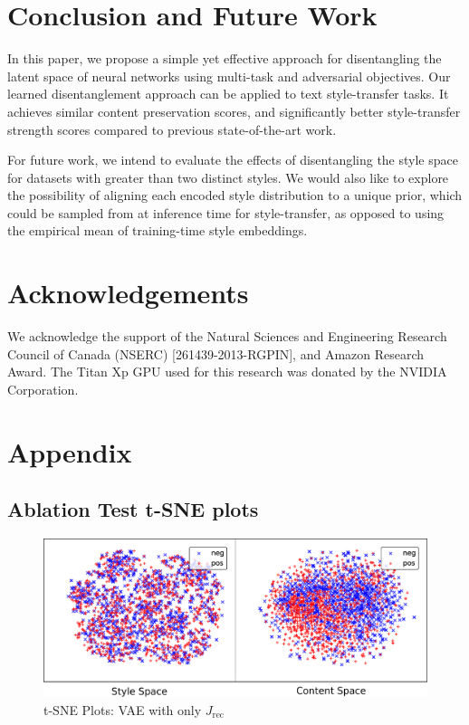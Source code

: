 \documentclass[letterpaper]{article} %
\newcommand{\loss}[1]{J_\text{#1}}
\begin{document}
\section{Conclusion and Future Work}
In this paper, we propose a simple yet effective approach for disentangling the latent space of neural networks using multi-task and adversarial objectives. Our learned disentanglement approach can be applied to text style-transfer tasks. It achieves similar content preservation scores, and significantly better style-transfer strength scores compared to previous state-of-the-art work.

For future work, we intend to evaluate the effects of disentangling the style space for datasets with greater than two distinct styles. We would also like to explore the possibility of aligning each encoded style distribution to a unique prior, which could be sampled from at inference time for style-transfer, as opposed to using the empirical mean of training-time style embeddings.

\section{Acknowledgements}
We acknowledge the support of the Natural Sciences and Engineering Research Council of Canada (NSERC) [261439-2013-RGPIN], and Amazon Research Award. The Titan Xp GPU used for this research was donated by the NVIDIA Corporation.




\pagebreak

\appendix

\section{Appendix}

\subsection{Ablation Test t-SNE plots}

\begin{figure}[h]
	\captionsetup{justification=centering}
	\includegraphics[width=\linewidth]{vae-latent-spaces-only-rec}
	\caption{t-SNE Plots: VAE with only $\loss{rec}$}
	\label{fig:vae-tsne-only-rec}
\end{figure}
\end{document}
